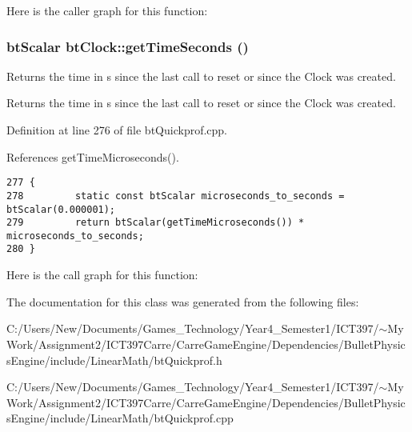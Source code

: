 Here is the caller graph for this function:\hypertarget{classbt_clock_3fd3c27b67fa12ff3a56a57679667936}{
\subsubsection[getTimeSeconds]{\setlength{\rightskip}{0pt plus 5cm}btScalar btClock::getTimeSeconds ()}}
\label{classbt_clock_3fd3c27b67fa12ff3a56a57679667936}


Returns the time in s since the last call to reset or since the Clock was created.

Returns the time in s since the last call to reset or since the Clock was created. 

Definition at line 276 of file btQuickprof.cpp.

References getTimeMicroseconds().

\begin{Code}\begin{verbatim}277 {
278         static const btScalar microseconds_to_seconds = btScalar(0.000001);
279         return btScalar(getTimeMicroseconds()) * microseconds_to_seconds;
280 }
\end{verbatim}
\end{Code}




Here is the call graph for this function:

The documentation for this class was generated from the following files:\begin{CompactItemize}
\item 
C:/Users/New/Documents/Games\_\-Technology/Year4\_\-Semester1/ICT397/$\sim$My Work/Assignment2/ICT397Carre/CarreGameEngine/Dependencies/BulletPhysicsEngine/include/LinearMath/btQuickprof.h\item 
C:/Users/New/Documents/Games\_\-Technology/Year4\_\-Semester1/ICT397/$\sim$My Work/Assignment2/ICT397Carre/CarreGameEngine/Dependencies/BulletPhysicsEngine/include/LinearMath/btQuickprof.cpp\end{CompactItemize}
